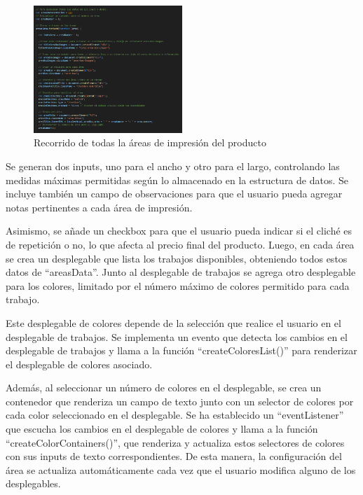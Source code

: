 \documentclass[11pt]{article}
\begin{document}
\begin{figure}[H]
    \centering
    \includegraphics[width=0.5\textwidth]{imagenesUS3-modal/recorrerAreasyMostrar.png}
    \caption{\label{fig:recorrerAreas} Recorrido de todas la áreas de impresión del producto}
    \vspace{\fill}
\end{figure}

Se generan dos inputs, uno para el ancho y otro para el largo, controlando las medidas máximas permitidas según lo almacenado en la estructura de datos.
Se incluye también un campo de observaciones para que el usuario pueda agregar notas pertinentes a cada área de impresión.

Asimismo, se añade un checkbox para que el usuario pueda indicar si el cliché es de repetición o no, lo que afecta al precio final del producto. Luego, 
en cada área se crea un desplegable que lista los trabajos disponibles, obteniendo todos estos datos de ``areasData''. Junto al desplegable de trabajos se agrega 
otro desplegable para los colores, limitado por el número máximo de colores permitido para cada trabajo.

Este desplegable de colores depende de la selección que realice el usuario en el desplegable de trabajos. Se implementa un evento que detecta los cambios en el 
desplegable de trabajos y llama a la función ``createColoresList()'' para renderizar el desplegable de colores asociado.

Además, al seleccionar un número de colores en el desplegable, se crea un contenedor que renderiza un campo de texto junto con un selector de colores por cada 
color seleccionado en el desplegable. Se ha establecido un ``eventListener'' que escucha los cambios en el desplegable de colores y llama a la función 
``createColorContainers()'', que renderiza y actualiza estos selectores de colores con sus inputs de texto correspondientes. De esta manera, 
la configuración del área se actualiza automáticamente cada vez que el usuario modifica alguno de los desplegables.
\end{document}
